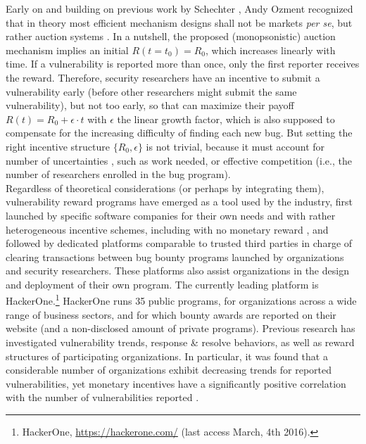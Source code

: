 Early on and building on previous work by Schechter \cite{schechter2002buy}, Andy Ozment \cite{ozment2004bug} recognized that in theory most efficient mechanism designs shall not be markets {\it per se}, but rather auction systems \cite{milgrom1982theory}. In a nutshell, the proposed (monopsonistic) auction mechanism implies an initial $R(t=t_0) = R_0$, which increases linearly with time.  If a vulnerability is reported more than once, only the first reporter receives the reward. Therefore, security researchers have an incentive to submit a vulnerability early (before other researchers might submit the same vulnerability), but not too early, so that can maximize their payoff $R(t) = R_0 + \epsilon \cdot t$ with $\epsilon$ the linear growth factor, which is also supposed to compensate for the increasing difficulty of finding each new bug. But setting the right incentive structure $\{R_0,\epsilon \}$ is not trivial, because it must account for number of uncertainties \cite{pandey2014assessment}, such as work needed, or effective competition (i.e., the number of researchers enrolled in the bug program).\\

Regardless of theoretical considerations (or perhaps by integrating them), vulnerability reward programs have emerged as a tool used by the industry, first launched by specific software companies for their own needs and with rather heterogeneous incentive schemes\cite{finifter2013empirical}, including with no monetary reward \cite{zhao2014exploratory}, and followed by dedicated platforms comparable to trusted third parties in charge of clearing transactions between bug bounty programs launched by organizations and security researchers. These platforms also assist organizations in the design and deployment of their own program. The currently leading platform is HackerOne.\footnote{HackerOne, \url{https://hackerone.com/} (last access March, 4th 2016).} HackerOne runs 35 public programs, for organizations across a wide range of business sectors, and for which bounty awards are reported on their website (and a non-disclosed amount of private programs). Previous research has investigated vulnerability trends, response \& resolve behaviors, as well as reward structures of participating organizations. In particular, it was found that a considerable number of organizations exhibit decreasing trends for reported vulnerabilities, yet monetary incentives have a significantly positive correlation with the number of vulnerabilities reported \cite{zhao2015empirical}.